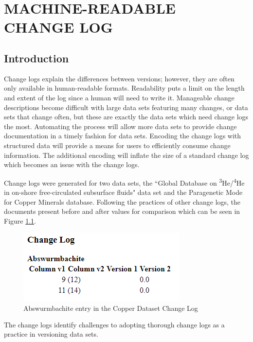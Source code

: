 
\chapter{MACHINE-READABLE CHANGE LOG}\label{ch:changelog}

\section{Introduction}

Change logs explain the differences between versions; however, they are often only available in human-readable formats.
Readability puts a limit on the length and extent of the log since a human will need to write it.
Manageable change descriptions become difficult with large data sets featuring many changes, or data sets that change often, but these are exactly the data sets which need change logs the most.
Automating the process will allow more data sets to provide change documentation in a timely fashion for data sets.
Encoding the change logs with structured data will provide a means for users to efficiently consume change information.
The additional encoding will inflate the size of a standard change log which becomes an issue with the change logs.

Change logs were generated for two data sets, the ``Global Database on \textsuperscript{3}He/\-\textsuperscript{4}He in on-shore free-circulated subsurface fluids" data set and the Paragenetic Mode for Copper Minerals database.
Following the practices of other change logs, the documents present before and after values for comparison which can be seen in Figure \ref{changelog_zoomed}.
\begin{figure}
	\centering
	\includegraphics[scale=0.80]{figures/Changelog-zoomed.png}
	\caption{Abswurmbachite entry in the Copper Dataset Change Log}
	\label{changelog_zoomed}
\end{figure}
The change logs identify challenges to adopting thorough change logs as a practice in versioning data sets.

